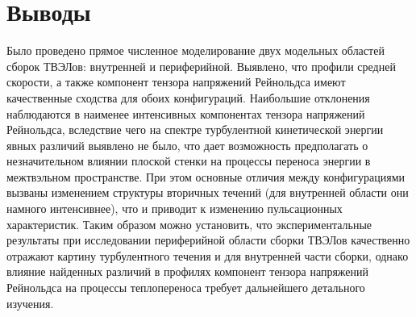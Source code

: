\section{Выводы}\label{ch4:conclusion}
%
Было проведено прямое численное моделирование двух модельных областей сборок ТВЭЛов: внутренней и периферийной. 
%
Выявлено, что профили средней скорости, а также компонент тензора напряжений Рейнольдса имеют качественные сходства для обоих конфигураций. 
%
Наибольшие отклонения наблюдаются в наименее интенсивных компонентах тензора напряжений Рейнольдса, вследствие чего на спектре турбулентной кинетической энергии явных различий выявлено не было, что дает возможность предполагать о незначительном влиянии плоской стенки на процессы переноса энергии в межтвэльном пространстве. 
%
При этом основные отличия между конфигурациями вызваны изменением структуры вторичных течений (для внутренней области они намного интенсивнее), что и приводит к изменению пульсационных характеристик.
%
Таким образом можно установить, что экспериментальные результаты при исследовании периферийной области сборки ТВЭЛов качественно отражают картину турбулентного течения и для внутренней части сборки, однако влияние найденных различий в профилях компонент тензора напряжений Рейнольдса на процессы теплопереноса требует дальнейшего детального изучения.

